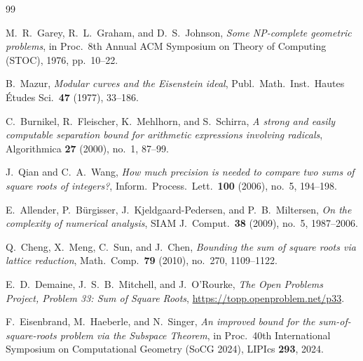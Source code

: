 \documentclass[11pt,a4paper]{article}
\theoremstyle{definition}
\theoremstyle{remark}
\begin{document}
\begin{thebibliography}{99}

M.~R.~Garey, R.~L.~Graham, and D.~S.~Johnson,
\emph{Some NP-complete geometric problems},
in Proc.\ 8th Annual ACM Symposium on Theory of Computing (STOC), 1976, pp.~10--22.

B.~Mazur,
\emph{Modular curves and the Eisenstein ideal},
Publ.\ Math.\ Inst.\ Hautes \'Etudes Sci.\ \textbf{47} (1977), 33--186.

C.~Burnikel, R.~Fleischer, K.~Mehlhorn, and S.~Schirra,
\emph{A strong and easily computable separation bound for arithmetic expressions involving radicals},
Algorithmica \textbf{27} (2000), no.~1, 87--99.

J.~Qian and C.~A.~Wang,
\emph{How much precision is needed to compare two sums of square roots of integers?},
Inform.\ Process.\ Lett.\ \textbf{100} (2006), no.~5, 194--198.

E.~Allender, P.~B\"urgisser, J.~Kjeldgaard-Pedersen, and P.~B.~Miltersen,
\emph{On the complexity of numerical analysis},
SIAM J.\ Comput.\ \textbf{38} (2009), no.~5, 1987--2006.

Q.~Cheng, X.~Meng, C.~Sun, and J.~Chen,
\emph{Bounding the sum of square roots via lattice reduction},
Math.\ Comp.\ \textbf{79} (2010), no.~270, 1109--1122.

E.~D.~Demaine, J.~S.~B.~Mitchell, and J.~O'Rourke,
\emph{The Open Problems Project, Problem 33: Sum of Square Roots},
\url{https://topp.openproblem.net/p33}.

F.~Eisenbrand, M.~Haeberle, and N.~Singer,
\emph{An improved bound for the sum-of-square-roots problem via the Subspace Theorem},
in Proc.\ 40th International Symposium on Computational Geometry (SoCG 2024), LIPIcs \textbf{293}, 2024.

\end{thebibliography}
\end{document}
